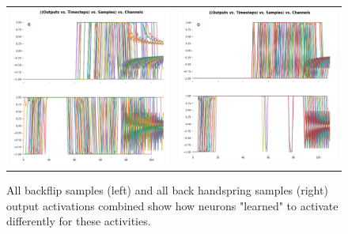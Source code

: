 \begin{figure}
   \centering
\begin{tabular}{cc}
\includegraphics[width=7.5cm]{images/classifier/model-output-simple-rnn-339/simple-rnn-339-out-backflips}&
\includegraphics[width=7.5cm]{images/classifier/model-output-simple-rnn-339/simple-rnn-339-out-flacks}\\
\end{tabular}
    \caption{All backflip samples (left) and all back handspring samples (right) output activations combined show how neurons "learned" to activate differently for these activities.}
    \label{simple-rnn-all-samples-outputs-combined}
\end{figure}










